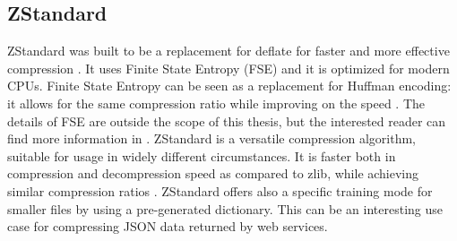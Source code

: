 \subsection{ZStandard}
ZStandard was built to be a replacement for deflate for faster and more effective compression
\cite{ColletY2018Smaller}. It uses Finite State Entropy (FSE) \cite{ColletY2013Finite}
and it is optimized for modern CPUs. Finite State Entropy can be seen as a replacement
for Huffman encoding: it allows for the same compression ratio while improving
on the speed \cite{ColletY2013Finite}. The details of FSE are outside the scope of
this thesis, but the interested reader can find more information in \cite{ColletY2013Finite}
\cite{ColletY2014FSE}.
ZStandard is a versatile compression algorithm, suitable for usage in widely
different circumstances. It is faster both in compression and decompression
speed as compared to zlib, while achieving similar compression ratios \cite{ColletY2018Smaller}.
ZStandard offers also a specific training mode for smaller files by using a
pre-generated dictionary. This can be an interesting use case for compressing
JSON data returned by web services.
